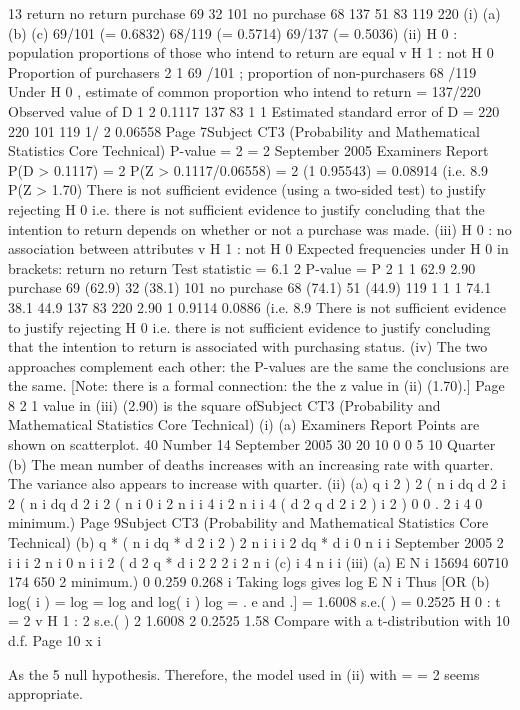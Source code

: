 \documentclass[a4paper,12pt]{article}
\begin{document}
13
return
no return
purchase
69
32
101
no purchase
68
137
51
83
119
220
(i) (a)
(b)
(c)
69/101 (= 0.6832)
68/119 (= 0.5714)
69/137 (= 0.5036)
(ii) H 0 : population proportions of those who intend to return are equal
v H 1 : not H 0
Proportion of purchasers
2
1
69 /101 ; proportion of non-purchasers
68 /119
Under H 0 , estimate of common proportion who intend to return = 137/220
Observed value of D
1
2
0.1117
137 83 1
1
Estimated standard error of D =
220 220 101 119
1/ 2
0.06558
Page 7Subject CT3 (Probability and Mathematical Statistics Core Technical)
P-value = 2
= 2
September 2005
Examiners Report
P(D > 0.1117) = 2 P(Z > 0.1117/0.06558) = 2
(1 0.95543) = 0.08914 (i.e. 8.9%
P(Z > 1.70)
There is not sufficient evidence (using a two-sided test) to justify rejecting H 0
i.e. there is not sufficient evidence to justify concluding that the intention to
return depends on whether or not a purchase was made.
(iii)
H 0 : no association between attributes v H 1 : not H 0
Expected frequencies under H 0 in brackets:
return
no return
Test statistic = 6.1 2
P-value = P
2
1
1
62.9
2.90
purchase
69 (62.9)
32 (38.1)
101
no purchase
68 (74.1)
51 (44.9)
119
1
1
1
74.1 38.1 44.9
137
83
220
2.90
1 0.9114 0.0886 (i.e. 8.9%
There is not sufficient evidence to justify rejecting H 0 i.e. there is not
sufficient evidence to justify concluding that the intention to return is
associated with purchasing status.
(iv)
The two approaches complement each other:
the P-values are the same
the conclusions are the same.
[Note: there is a formal connection: the
the z value in (ii) (1.70).]
Page 8
2
1 value
in (iii) (2.90) is the square ofSubject CT3 (Probability and Mathematical Statistics Core Technical)
(i)
(a)
Examiners Report
Points are shown on scatterplot.
40
Number
14
September 2005
30
20
10
0
0
5
10
Quarter
(b)
The mean number of deaths increases with an increasing rate with
quarter.
The variance also appears to increase with quarter.
(ii)
(a)
q
i 2 ) 2
( n i
dq
d
2 i 2 ( n i
dq
d
2 i 2 ( n i
0
i 2 n i
i 4
i 2 n i
i 4
(
d 2 q
d
2
i 2 )
i 2 ) 0
0
.
2 i 4
0
minimum.)
Page 9Subject CT3 (Probability and Mathematical Statistics Core Technical)
(b)
q * ( n i
dq *
d 2
i 2 ) 2
n i
i
i 2
dq *
d
i
0
n i
i
September 2005
2
i
i
i 2
n i
0
n i
i 2
(
d 2 q *
d
i 2
2
2
i 2 n i
(c)
i
4
n i
i
(iii)
(a)
E N i
15694
60710
174
650
2
minimum.)
0
0.259
0.268
i
Taking logs gives
log E N i
Thus
[OR
(b)
log( i ) = log
= log and
log( i ) log
= .
e and
.]
= 1.6008 s.e.( ) = 0.2525
H 0 :
t
= 2 v H 1 :
2
s.e.( )
2
1.6008 2
0.2525
1.58
Compare with a t-distribution with 10 d.f.
Page 10
x i

As the 5%
null hypothesis.
Therefore, the model used in (ii) with
=
= 2 seems appropriate.
\end{document}
